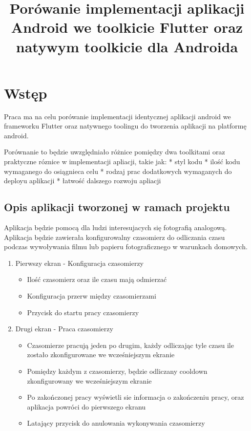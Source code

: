 \documentclass[12pt,a4paper]{article}
\title{Porówanie implementacji aplikacji Android we toolkicie Flutter oraz natywym toolkicie dla Androida}
\begin{document}
\section{Wstęp}

Praca ma na celu porówanie implementacji identycznej aplikacji android we frameworku Flutter 
oraz natywnego toolingu do tworzenia aplikacji na platformę android. 

Porównanie to będzie uwzględniało różnice pomiędzy dwa toolkitami oraz praktyczne róznice w implementacji apliacji, takie jak: 
 * styl kodu
 * ilość kodu wymaganego do osiągnieca celu
 * rodzaj prac dodatkowych wymaganych do deployu aplikacji
 * łatwość dalszego rozwoju apliacji

\subsection{Opis aplikacji tworzonej w ramach projektu}

Aplikacja będzie pomocą dla ludzi interesujacych się fotografią analogową. Aplikacja będzie zawierała konfigurowalny czasomierz do odliczania czasu
podczas wywoływania filmu lub papieru fotograficznego w warunkach domowych.

\begin{enumerate}
    \item Pierwszy ekran - Konfiguracja czasomierzy
    \begin{itemize}
        \item Ilość czasomierz oraz ile czasu mają odmierzać
        \item Konfiguracja przerw między czasomierzami
        \item Przycisk do startu pracy czasomierzy
    \end{itemize}
    \item Drugi ekran - Praca czasomierzy
    \begin{itemize}
        \item Czasomierze pracują jeden po drugim, każdy odliczając tyle czasu ile zostało zkonfigurowane we wcześniejszym ekranie
        \item Pomiędzy każdym z czasomierzy, będzie odliczany cooldown zkonfigurowany we wcześniejszym ekranie
        \item Po zakończonej pracy wyświetli sie informacja o zakończeniu pracy, oraz aplikacja powróci do pierwszego ekranu
        \item Latający przycisk do anulowania wykonywania czasomierzy
    \end{itemize}
\end{enumerate}
\end{document}
